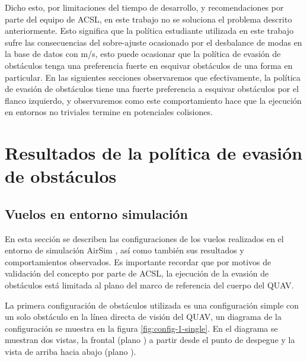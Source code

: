 Dicho esto, por limitaciones del tiempo de desarrollo, y recomendaciones por parte del equipo de ACSL, en este trabajo no se soluciona el problema descrito anteriormente. Esto significa que la política estudiante utilizada en este trabajo sufre las consecuencias del sobre-ajuste ocasionado por el desbalance de modas en la base de datos con  m/s, esto puede ocasionar que la política de evasión de obstáculos tenga una preferencia fuerte en esquivar obstáculos de una forma en particular. En las siguientes secciones observaremos que efectivamente, la política de evasión de obstáculos tiene una fuerte preferencia a esquivar obstáculos por el flanco izquierdo, y observaremos como este comportamiento hace que la ejecución en entornos no triviales termine en potenciales colisiones.

\section{Resultados de la política de evasión de obstáculos}

\label{sec:results-flights}

\subsection{Vuelos en entorno simulación}

\label{sec:results-AirSim}

En esta sección se describen las configuraciones de los vuelos realizados en el entorno de simulación AirSim \cite{shah2018airsim}, así como también sus resultados y comportamientos observados. Es importante recordar que por motivos de validación del concepto por parte de ACSL, la ejecución de la evasión de obstáculos está limitada al plano  del marco de referencia del cuerpo del QUAV.

La primera configuración de obstáculos utilizada es una configuración simple con un solo obstáculo en la línea directa de visión del QUAV, un diagrama de la configuración se muestra en la figura \ref{fig:config-1-single}. En el diagrama se muestran dos vistas, la frontal (plano ) a partir desde el punto de despegue y la vista de arriba hacia abajo (plano ).

